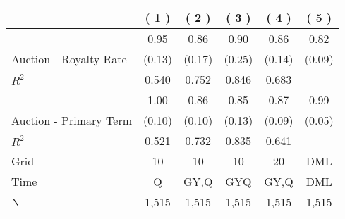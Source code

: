 
\begin{tabular}{lccccc}
\toprule
  & ( 1 ) & ( 2 ) & ( 3 ) & ( 4 ) & ( 5 )\\
\midrule
 & 0.95 & 0.86 & 0.90 & 0.86 & 0.82\\

\multirow{-2}{*}{\raggedright\arraybackslash Auction - Royalty Rate} & (0.13) & (0.17) & (0.25) & (0.14) & (0.09)\\

$R^2$ & 0.540 & 0.752 & 0.846 & 0.683 & \\

\midrule
 & 1.00 & 0.86 & 0.85 & 0.87 & 0.99\\

\multirow{-2}{*}{\raggedright\arraybackslash Auction - Primary Term} & (0.10) & (0.10) & (0.13) & (0.09) & (0.05)\\

$R^2$ & 0.521 & 0.732 & 0.835 & 0.641 & \\

\midrule
Grid & 10 & 10 & 10 & 20 & DML\\

Time & Q & GY,Q & GYQ & GY,Q & DML\\

N & 1,515 & 1,515 & 1,515 & 1,515 & 1,515\\
\bottomrule
\end{tabular}
